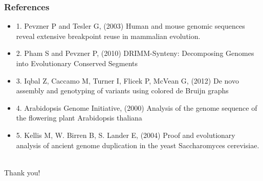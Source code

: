 \documentclass[svgnames,14pt]{beamer}
\begin{document}
\begin{frame}
\frametitle{References}
\begin{itemize}
\item 1. Pevzner P and Tesler G, (2003) Human and mouse genomic sequences reveal extensive breakpoint reuse in mammalian evolution. 
\item 2. Pham S and Pevzner P, (2010) DRIMM-Synteny: Decomposing Genomes into Evolutionary Conserved Segments
\item 3. Iqbal Z, Caccamo M, Turner I, Flicek P, McVean G, (2012) De novo assembly and genotyping of variants using colored de Bruijn graphs
\item 4. Arabidopsis Genome Initiative, (2000) Analysis of the genome sequence of the flowering plant Arabidopsis thaliana
\item 5. Kellis M, W. Birren B, S. Lander E, (2004) Proof and evolutionary analysis of ancient genome duplication in the yeast Saccharomyces cerevisiae.
\end{itemize}
\end{frame}

\begin{center}
\hfill \huge \\
\vspace{60pt}
Thank you!
\end{center}
\end{document}
